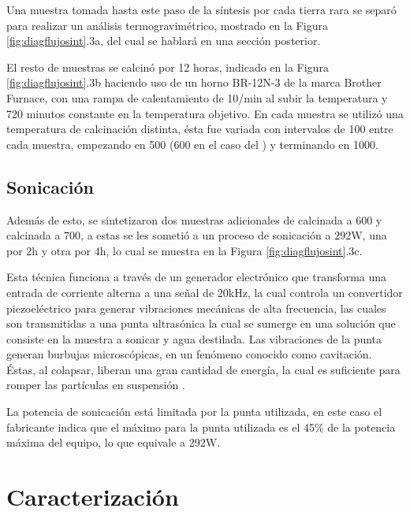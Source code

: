 \documentclass[../main.tex]{subfiles}
\begin{document}
    Una muestra tomada hasta este paso de la síntesis por cada tierra rara se separó para realizar un análisis termogravimétrico, mostrado en la Figura \ref{fig:diagflujosint}.3a, del cual se hablará en una sección posterior.

    El resto de muestras se calcinó por 12 horas, indicado en la Figura \ref{fig:diagflujosint}.3b haciendo uso de un horno BR-12N-3 de la marca Brother Furnace, con una rampa de calentamiento de 10\gradoC{}/min al subir la temperatura y 720 minutos constante en la temperatura objetivo. En cada muestra se utilizó una temperatura de calcinación distinta, ésta fue variada con intervalos de 100\gradoC{} entre cada muestra, empezando en 500\gradoC{} (600\gradoC{} en el caso del \sama{}) y terminando en 1000\gradoC{}.
\subsection{Sonicación}
    Además de esto, se sintetizaron dos muestras adicionales de \neod{} calcinada a 600\gradoC{} y \sama{} calcinada a 700\gradoC{}, a estas se les sometió a un proceso de sonicación a 292W, una por 2h y otra por 4h, lo cual se muestra en la Figura \ref{fig:diagflujosint}.3c.

    Esta técnica funciona a través de un generador electrónico que transforma una entrada de corriente alterna a una señal de 20kHz, la cual controla un convertidor piezoeléctrico para generar vibraciones mecánicas de alta frecuencia, las cuales son transmitidas a una punta ultrasónica la cual se sumerge en una solución que consiste en la muestra a sonicar y agua destilada. Las vibraciones de la punta generan burbujas microscópicas, en un fenómeno conocido como cavitación. Éstas, al colapsar, liberan una gran cantidad de energía, la cual es suficiente para romper las partículas en suspensión \cite{sonicaciondef}.

    La potencia de sonicación está limitada por la punta utilizada, en este caso el fabricante indica que el máximo para la punta utilizada es el 45\% de la potencia máxima del equipo, lo que equivale a 292W.
\section{Caracterización}
\end{document}

